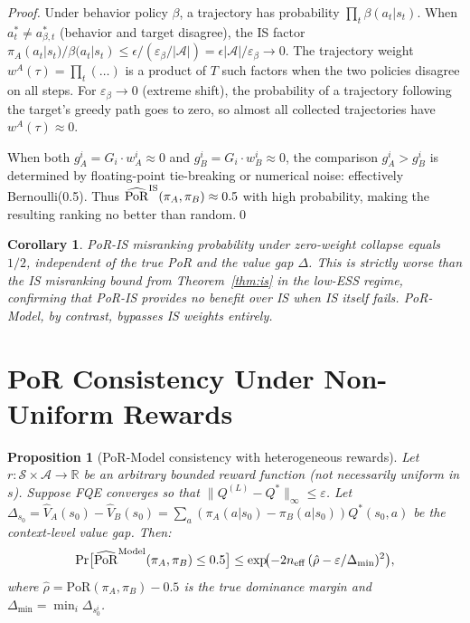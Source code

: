 \documentclass[10pt]{article}
\theoremstyle{plain}
\newtheorem{proposition}[theorem]{Proposition}
\newtheorem{corollary}[theorem]{Corollary}
\theoremstyle{definition}
\theoremstyle{remark}
\newcommand{\R}{\mathbb{R}}
\newcommand{\PoR}{\mathrm{PoR}}
\newcommand{\neff}{n_{\mathrm{eff}}}
\newcommand{\piA}{\pi_A}
\newcommand{\piB}{\pi_B}
\newcommand{\calS}{\mathcal{S}}
\newcommand{\calA}{\mathcal{A}}
\begin{document}
\begin{proof}
  Under behavior policy $\beta$, a trajectory has probability
  $\prod_t\beta(a_t|s_t)$.  When $a_t^*\neq a_{\beta,t}^*$ (behavior and
  target disagree), the IS factor $\pi_A(a_t|s_t)/\beta(a_t|s_t)\leq
  \epsilon/(\varepsilon_\beta/|\calA|)=\epsilon|\calA|/\varepsilon_\beta\to 0$.
  The trajectory weight $w^A(\tau)=\prod_t(\ldots)$ is a product of $T$
  such factors when the two policies disagree on all steps.  For
  $\varepsilon_\beta\to 0$ (extreme shift), the probability of a trajectory
  following the target's greedy path goes to zero, so almost all collected
  trajectories have $w^A(\tau)\approx 0$.

  When both $g_A^i=G_i\cdot w_A^i\approx 0$ and $g_B^i=G_i\cdot w_B^i\approx 0$,
  the comparison $g_A^i > g_B^i$ is determined by floating-point tie-breaking
  or numerical noise: effectively Bernoulli(0.5).  Thus
  $\widehat{\PoR}^{\rm IS}(\pi_A,\pi_B)\approx 0.5$ with high probability,
  making the resulting ranking no better than random.\qed
\end{proof}

\begin{corollary}
  PoR-IS misranking probability under zero-weight collapse equals $1/2$,
  independent of the true PoR and the value gap $\Delta$.  This is strictly
  worse than the IS misranking bound from Theorem~\ref{thm:is} in the
  low-ESS regime, confirming that PoR-IS provides no benefit over IS when
  IS itself fails.  PoR-Model, by contrast, bypasses IS weights entirely.
\end{corollary}

\section{PoR Consistency Under Non-Uniform Rewards}
\label{app:goldmine_theory}

\begin{proposition}[PoR-Model consistency with heterogeneous rewards]
  \label{prop:goldmine}
  Let $r: \calS\times\calA\to\R$ be an arbitrary bounded reward function
  (not necessarily uniform in $s$).  Suppose FQE converges so that
  $\|Q^{(L)}-Q^*\|_\infty \leq \varepsilon$.  Let $\Delta_{s_0}
  = \hat{V}_A(s_0) - \hat{V}_B(s_0) = \sum_a(\pi_A(a|s_0)-\pi_B(a|s_0))Q^*(s_0,a)$
  be the context-level value gap.  Then:
  \begin{equation}
    \Pr\bigl[\widehat{\PoR}^{\rm Model}(\piA,\piB)\leq 0.5\bigr]
    \leq \exp\!\bigl(-2\neff\,(\hat{\rho}-\varepsilon/\Delta_{\min})^2\bigr),
    \label{eq:goldmine_bound}
  \end{equation}
  where $\hat{\rho}=\PoR(\piA,\piB)-0.5$ is the true dominance margin and
  $\Delta_{\min}=\min_{i}\Delta_{s_0^i}$.
\end{proposition}
\end{document}
